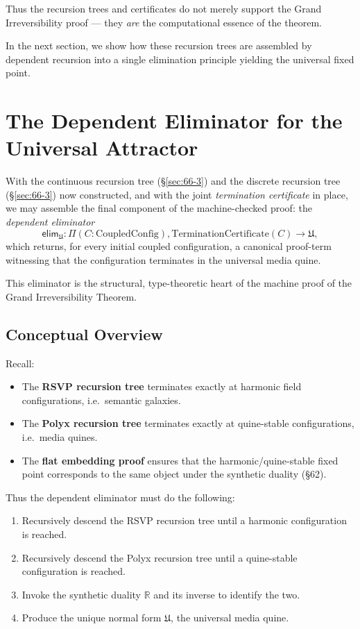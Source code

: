 Thus the recursion trees and certificates do not merely support the Grand Irreversibility proof —  
they \emph{are} the computational essence of the theorem.

\medskip

In the next section, we show how these recursion trees are assembled by dependent recursion into a single elimination principle yielding the universal fixed point.

\section{The Dependent Eliminator for the Universal Attractor}
\label{sec:66-4}

With the continuous recursion tree (\S\ref{sec:66-3}) and the discrete recursion tree (\S\ref{sec:66-3}) now constructed, and with the joint \emph{termination certificate} in place, we may assemble the final component of the machine-checked proof: the \emph{dependent eliminator}
\[
   \mathsf{elim}_{\mathfrak{U}}
      : \Pi (C : \mathrm{CoupledConfig}),
         \mathrm{TerminationCertificate}(C)
            \to \mathfrak{U},
\]
which returns, for every initial coupled configuration, a canonical proof-term witnessing that the configuration terminates in the universal media quine.

This eliminator is the structural, type-theoretic heart of the machine proof of the Grand Irreversibility Theorem.

\subsection{Conceptual Overview}

Recall:

\begin{itemize}
\item The \textbf{RSVP recursion tree} terminates exactly at harmonic field configurations, i.e.\ semantic galaxies.
\item The \textbf{Polyx recursion tree} terminates exactly at quine-stable configurations, i.e.\ media quines.
\item The \textbf{flat embedding proof} ensures that the harmonic/quine-stable fixed point corresponds to the same object under the synthetic duality (\S62).
\end{itemize}

Thus the dependent eliminator must do the following:

\begin{enumerate}
\item Recursively descend the RSVP recursion tree until a harmonic configuration is reached.
\item Recursively descend the Polyx recursion tree until a quine-stable configuration is reached.
\item Invoke the synthetic duality $\mathbb{R}$ and its inverse to identify the two.
\item Produce the unique normal form $\mathfrak{U}$, the universal media quine.
\end{enumerate}

